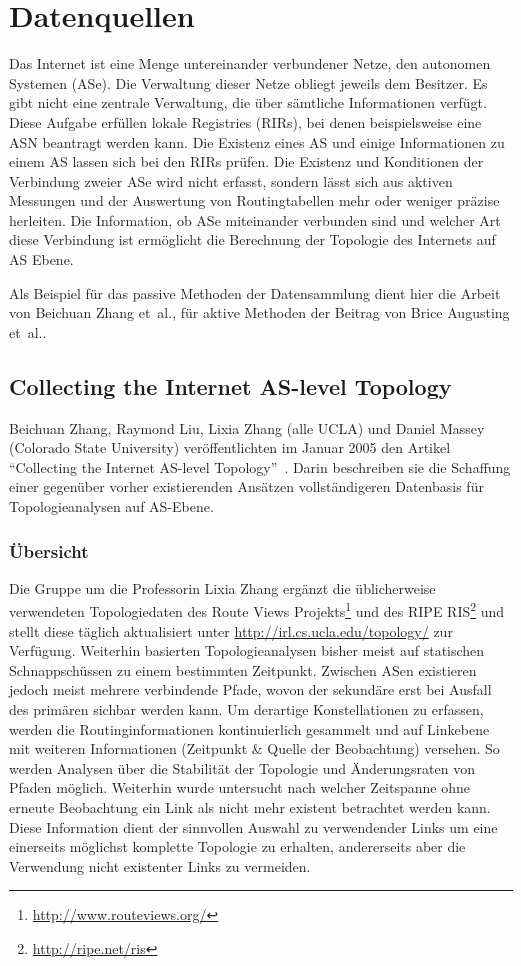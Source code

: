 \section{Datenquellen}\label{sec:datenquellen}

Das Internet ist eine Menge untereinander verbundener Netze, den autonomen Systemen (ASe).
Die Verwaltung dieser Netze obliegt jeweils dem Besitzer. Es gibt nicht eine zentrale Verwaltung, die über sämtliche Informationen verfügt.
Diese Aufgabe erfüllen lokale Registries (RIRs), bei denen beispielsweise eine ASN beantragt werden kann.
Die Existenz eines AS und einige Informationen zu einem AS lassen sich bei den RIRs prüfen.
Die Existenz und Konditionen der Verbindung zweier ASe wird nicht erfasst, sondern lässt sich aus aktiven Messungen und der Auswertung von Routingtabellen mehr oder weniger präzise herleiten.
Die Information, ob ASe miteinander verbunden sind und welcher Art diese Verbindung ist ermöglicht die Berechnung der Topologie des Internets auf AS Ebene.

Als Beispiel für das passive Methoden der Datensammlung dient hier die Arbeit von Beichuan Zhang et\ al., für aktive Methoden der Beitrag von Brice Augusting et\ al..

\subsection{Collecting the Internet AS-level Topology}\label{subsec:collecting}

Beichuan Zhang, Raymond Liu, Lixia Zhang (alle UCLA) und Daniel Massey (Colorado State University) veröffentlichten im Januar 2005 den Artikel "`Collecting the Internet AS-level Topology"'~\cite{Zhang:2005:CIA:1052812.1052825}.
Darin beschreiben sie die Schaffung einer gegenüber vorher existierenden Ansätzen vollständigeren Datenbasis für Topologieanalysen auf AS-Ebene.

\subsubsection{Übersicht}
Die Gruppe um die Professorin Lixia Zhang ergänzt die üblicherweise verwendeten Topologiedaten des Route Views Projekts\footnote{\url{http://www.routeviews.org/}} und des RIPE RIS\footnote{\url{http://ripe.net/ris}} und stellt diese täglich aktualisiert unter \url{http://irl.cs.ucla.edu/topology/} zur Verfügung.
Weiterhin basierten Topologieanalysen bisher meist auf statischen Schnappschüssen zu einem bestimmten Zeitpunkt.
Zwischen ASen existieren jedoch meist mehrere verbindende Pfade, wovon der sekundäre erst bei Ausfall des primären sichbar werden kann.
Um derartige Konstellationen zu erfassen, werden die Routinginformationen kontinuierlich gesammelt und auf Linkebene mit weiteren Informationen (Zeitpunkt \& Quelle der Beobachtung) versehen.
So werden Analysen über die Stabilität der Topologie und Änderungsraten von Pfaden möglich.
Weiterhin wurde untersucht nach welcher Zeitspanne ohne erneute Beobachtung ein Link als nicht mehr existent betrachtet werden kann.
Diese Information dient der sinnvollen Auswahl zu verwendender Links um eine einerseits möglichst komplette Topologie zu erhalten, andererseits aber die Verwendung nicht existenter Links zu vermeiden.

